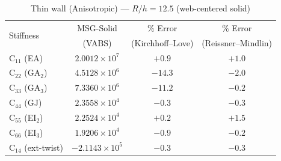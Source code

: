 \begin{table}[htpb]
\centering
\caption{Thin wall (Anisotropic) --- $R/h = 12.5$ (web-centered solid)}
\label{tab:multicell2_aniso_thin}
\begin{tabular}{lccc}
\hline
\multirow{2}{*}{Stiffness} & MSG-Solid & $\%$ Error & $\%$ Error\\
 & (VABS) & (Kirchhoff--Love) & (Reissner--Mindlin) \\
\hline
C$_{11}$ (EA) & $2.0012 \times 10^{7}$ & $+0.9$ & $+1.0$ \\
C$_{22}$ (GA$_2$) & $4.5128 \times 10^{6}$ & $-14.3$ & $-2.0$ \\
C$_{33}$ (GA$_3$) & $7.3360 \times 10^{6}$ & $-11.2$ & $-0.2$ \\
C$_{44}$ (GJ) & $2.3558 \times 10^{4}$ & $-0.3$ & $-0.3$ \\
C$_{55}$ (EI$_2$) & $2.2524 \times 10^{4}$ & $+0.2$ & $+1.5$ \\
C$_{66}$ (EI$_3$) & $1.9206 \times 10^{4}$ & $-0.9$ & $-0.2$ \\
C$_{14}$ (ext-twist) & $-2.1143 \times 10^{5}$ & $-0.3$ & $-0.3$ \\
\hline
\end{tabular}
\end{table}
